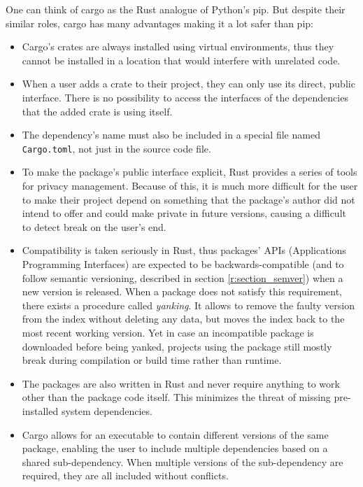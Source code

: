 \documentclass[licencjacka,en]{pracamgr}
\begin{document}
One can think of cargo as the Rust analogue of Python's pip. But despite their similar roles,
cargo has many advantages making it a lot safer than pip:
\begin{itemize}
	\item Cargo's crates are always installed using virtual environments, thus they cannot be
		installed in a location that would interfere with unrelated code.
	\item When a user adds a crate to their project, they can only use its direct, public interface.
		There is no possibility to access the interfaces of the dependencies that the added crate
		is using itself.
	\item The dependency's name must also be included in a special file named \texttt{Cargo.toml},
		not just in the source code file.
	\item To make the package's public interface explicit, Rust provides a series of tools for
		privacy management. Because of this, it is much more difficult for the user to make their
		project depend on something that the package's author did not intend to offer and could
		make private in future versions, causing a difficult to detect break on the user's end.
	\item Compatibility is taken seriously in Rust, thus packages' APIs (Applications Programming Interfaces) are expected to be
		backwards-compatible (and to follow semantic versioning, described in section \ref{r:section_semver}) when
		a new version is released. When a package does not satisfy this requirement, there exists
		a procedure called \textit{yanking}. It allows to remove the faulty version from the index
		without deleting any data, but moves the index back to the most recent working version.
		Yet in case an incompatible package is downloaded before being yanked, projects using the
		package still mostly break during compilation or build time rather than runtime.
	\item The packages are also written in Rust and never require anything to work other than the
		package code itself. This minimizes the threat of missing pre-installed
		system dependencies.
	\item Cargo allows for an executable to contain different versions of the same package,
		enabling the user to include multiple dependencies based on a shared sub-dependency.
		When multiple versions of the sub-dependency are required, they are all included
		without conflicts.
\end{itemize}
\end{document}

